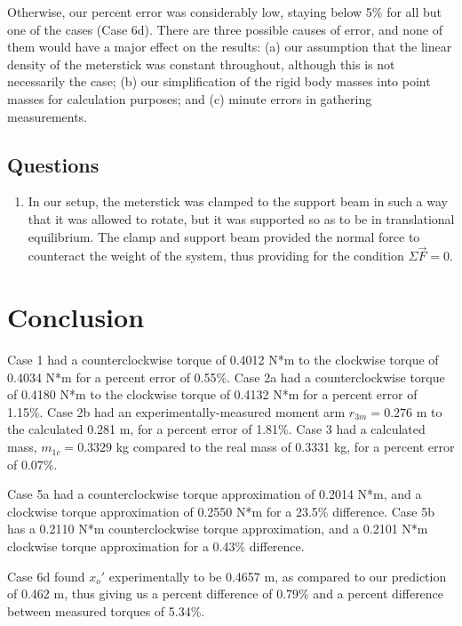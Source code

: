\documentclass[11pt, titlepage]{article}
\begin{document}
Otherwise, our percent error was considerably low, staying below 5\% for all but one of the cases (Case 6d). There are three possible causes of error, and none of them would have a major effect on the results: (a) our assumption that the linear density of the meterstick was constant throughout, although this is not necessarily the case; (b) our simplification of the rigid body masses into point masses for calculation purposes; and (c) minute errors in gathering measurements.

\subsection*{Questions}
\begin{enumerate}
\item In our setup, the meterstick was clamped to the support beam in such a way that it was allowed to rotate, but it was supported so as to be in translational equilibrium. The clamp and support beam provided the normal force to counteract the weight of the system, thus providing for the condition $\Sigma \vec{F} = 0$.
\end{enumerate}

\section*{Conclusion}
Case 1 had a counterclockwise torque of 0.4012 N*m to the clockwise torque of 0.4034 N*m for a percent error of 0.55\%. Case 2a had a counterclockwise torque of 0.4180 N*m to the clockwise torque of 0.4132 N*m for a percent error of 1.15\%. Case 2b had an experimentally-measured moment arm $r_{3m} = 0.276$ m to the calculated 0.281 m, for a percent error of 1.81\%. Case 3 had a calculated mass, $m_{1c} = 0.3329$ kg compared to the real mass of 0.3331 kg, for a percent error of 0.07\%.

Case 5a had a counterclockwise torque approximation of 0.2014 N*m, and a clockwise torque approximation of 0.2550 N*m for a 23.5\% difference. Case 5b has a 0.2110 N*m counterclockwise torque approximation, and a 0.2101 N*m clockwise torque approximation for a 0.43\% difference.

Case 6d found $x_o'$ experimentally to be 0.4657 m, as compared to our prediction of 0.462 m, thus giving us a percent difference of 0.79\% and a percent difference between measured torques of 5.34\%.
\end{document}
